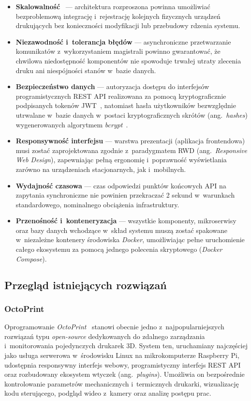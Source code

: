 \documentclass[a4paper,12pt,reqno]{article}
\begin{document}
\begin{itemize}
	\item \textbf{Skalowalność}~\cite{kleppmann2017} --- architektura rozproszona powinna umożliwiać bezproblemową integrację i~rejestrację kolejnych fizycznych urządzeń drukujących bez konieczności modyfikacji lub przebudowy rdzenia systemu.
	\item \textbf{Niezawodność i~tolerancja błędów} --- asynchroniczne przetwarzanie komunikatów z~wykorzystaniem magistrali powinno gwarantować, że chwilowa niedostępność komponentów nie spowoduje trwałej utraty zlecenia druku ani niespójności stanów w~bazie danych.
	\item \textbf{Bezpieczeństwo danych} --- autoryzacja dostępu do interfejsów programistycznych REST API realizowana za pomocą kryptograficznie podpisanych tokenów JWT~\cite{jwt}, natomiast hasła użytkowników bezwzględnie utrwalane w~bazie danych w~postaci kryptograficznych skrótów (ang.~\textit{hashes}) wygenerowanych algorytmem \textit{bcrypt}~\cite{bcrypt}.
	\item \textbf{Responsywność interfejsu} --- warstwa prezentacji (aplikacja frontendowa) musi zostać zaprojektowana zgodnie z~paradygmatem RWD (ang.~\textit{Responsive Web Design}), zapewniając pełną ergonomię i~poprawność wyświetlania zarówno na urządzeniach stacjonarnych, jak i~mobilnych.
	\item \textbf{Wydajność czasowa} --- czas odpowiedzi punktów końcowych API na zapytania synchroniczne nie powinien przekraczać 2 sekund w~warunkach standardowego, nominalnego obciążenia infrastruktury.
	\item \textbf{Przenośność i~konteneryzacja} --- wszystkie komponenty, mikroserwisy oraz bazy danych wchodzące w~skład systemu muszą zostać spakowane w~niezależne kontenery środowiska \textit{Docker}, umożliwiając pełne uruchomienie całego ekosystemu za pomocą jednego polecenia skryptowego (\textit{Docker Compose}).
\end{itemize}

\subsection{Przegląd istniejących rozwiązań}

\subsubsection{OctoPrint}

Oprogramowanie \textit{OctoPrint}~\cite{octoprint} stanowi obecnie jedno z~najpopularniejszych rozwiązań typu \textit{open-source} dedykowanych do zdalnego zarządzania i~monitorowania pojedynczych drukarek 3D. System ten, uruchamiany najczęściej jako usługa serwerowa w~środowisku Linux na mikrokomputerze Raspberry Pi, udostępnia responsywny interfejs webowy, programistyczny interfejs REST API oraz rozbudowany ekosystem wtyczek (ang.~\textit{plugins}). Umożliwia on bezpośrednie kontrolowanie parametrów mechanicznych i~termicznych drukarki, wizualizację kodu sterującego, podgląd wideo z~kamery oraz analizę postępu prac.
\end{document}
